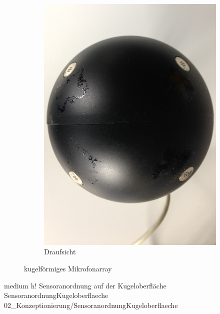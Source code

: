 \begin{figure}
\begin{subfigure}[b]{0.35\textwidth}
                \includegraphics[width=\textwidth]{grafiken/02_Konzeptionierung/Foto_MikrofonArray_Draufsicht}
                \caption{Draufsicht}
                \label{fig:Foto_MikrofonArray_Draufsicht}
        \end{subfigure}
        \caption{kugelförmiges Mikrofonarray}
        \label{fig:Foto_KugelfoermigesMikrofonarray}
\end{figure}




         {medium}                 %
         {h!}             %
         {Sensoranordnung auf der Kugeloberfläche}                %
         {SensoranordnungKugeloberflaeche}                %
         {02_Konzeptionierung/SensoranordnungKugeloberflaeche}     %








